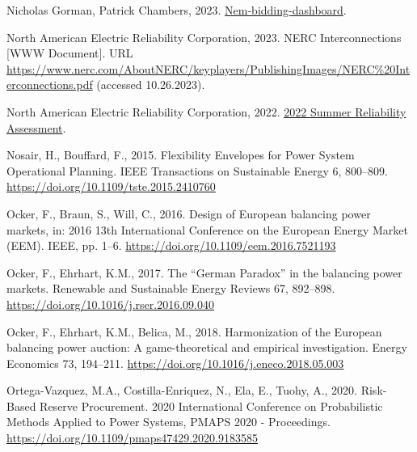 \documentclass[12pt,a4paper,]{report}
\newlength{\cslhangindent}
\newenvironment{CSLReferences}[2] %
 {%
  \setlength{\parindent}{0pt}
  \ifodd #1 \everypar{\setlength{\hangindent}{\cslhangindent}}\ignorespaces\fi
  \ifnum #2 > 0
  \setlength{\parskip}{#2\baselineskip}
  \fi
 }%
 {}
\begin{document}
\begin{CSLReferences}{1}{0}
\leavevmode{}%
Nicholas Gorman, Patrick Chambers, 2023.
\href{https://github.com/UNSW-CEEM/nem-bidding-dashboard}{Nem-bidding-dashboard}.

\leavevmode{}%
North American Electric Reliability Corporation, 2023. {NERC
Interconnections} {[}WWW Document{]}. URL
\url{https://www.nerc.com/AboutNERC/keyplayers/PublishingImages/NERC\%20Interconnections.pdf}
(accessed 10.26.2023).

\leavevmode{}%
North American Electric Reliability Corporation, 2022.
\href{https://www.nerc.com/pa/RAPA/ra/Reliability\%20Assessments\%20DL/NERC_SRA_2022.pdf}{2022
{Summer Reliability Assessment}}.

\leavevmode{}%
Nosair, H., Bouffard, F., 2015. Flexibility {Envelopes} for {Power
System Operational Planning}. IEEE Transactions on Sustainable Energy 6,
800--809. \url{https://doi.org/10.1109/tste.2015.2410760}

\leavevmode{}%
Ocker, F., Braun, S., Will, C., 2016. Design of {European} balancing
power markets, in: 2016 13th {International Conference} on the {European
Energy Market} ({EEM}). {IEEE}, pp. 1--6.
\url{https://doi.org/10.1109/eem.2016.7521193}

\leavevmode{}%
Ocker, F., Ehrhart, K.M., 2017. The {``{German Paradox}''} in the
balancing power markets. Renewable and Sustainable Energy Reviews 67,
892--898. \url{https://doi.org/10.1016/j.rser.2016.09.040}

\leavevmode{}%
Ocker, F., Ehrhart, K.M., Belica, M., 2018. Harmonization of the
{European} balancing power auction: {A} game-theoretical and empirical
investigation. Energy Economics 73, 194--211.
\url{https://doi.org/10.1016/j.eneco.2018.05.003}

\leavevmode{}%
Ortega-Vazquez, M.A., Costilla-Enriquez, N., Ela, E., Tuohy, A., 2020.
Risk-{Based Reserve Procurement}. 2020 International Conference on
Probabilistic Methods Applied to Power Systems, PMAPS 2020 -
Proceedings. \url{https://doi.org/10.1109/pmaps47429.2020.9183585}


\end{CSLReferences}
\end{document}
